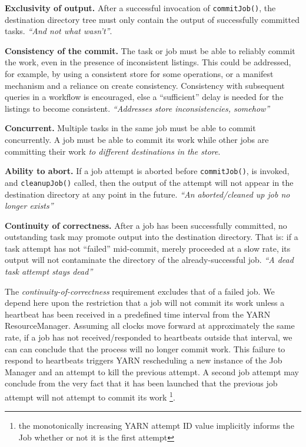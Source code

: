 \documentclass[conference]{IEEEtran}
\begin{document}
  \textbf{Exclusivity of output.}
  After a successful invocation of \texttt{commitJob()},
  the destination directory tree must only contain the output of successfully
  committed tasks.
  \emph{``And not what wasn't''}.

  \textbf{Consistency of the commit.}
  The task or job must be able to reliably commit the work, even in the presence
  of inconsistent listings.
  This could be addressed, for example, by using a consistent store for some operations,
  or a manifest mechanism and a reliance on create consistency.
  Consistency with subsequent queries in a workflow is encouraged, else a ``sufficient''
  delay is needed for the listings to become consistent.
  \emph{``Addresses store inconsistencies, somehow''}

  \textbf{Concurrent.}
  Multiple tasks in the same job must be able to commit concurrently.
  A job must be able to commit its work while other jobs are committing
  their work \emph{to different destinations in the store}.

  \textbf{Ability to abort.}
  If a job attempt is aborted before \texttt{commitJob()}, is invoked, and
  \texttt{cleanupJob()} called, then the output of the attempt will not appear in the
  destination directory at any point in the future.
  \emph{``An aborted/cleaned up job no longer exists''}


  \textbf{Continuity of correctness.}
  After a job has been successfully committed, no outstanding task may promote
  output into the destination directory.
  That is: if a task attempt has not ``failed'' mid-commit, merely proceeded at a slow rate,
  its output will not contaminate the directory of the already-successful job.
  \emph{``A dead task attempt stays dead''}


The \emph{continuity-of-correctness} requirement excludes that of a failed job.
We depend here upon the restriction that a job will not commit its work unless
a heartbeat has been received in a predefined time interval from the YARN ResourceManager.
Assuming all clocks move forward at approximately the same rate, if a job has
not received/responded to heartbeats outside that interval,
we can can conclude that the process will no longer commit work.
This failure to respond to heartbeats triggers YARN rescheduling a new
instance of the Job Manager and an attempt to kill the previous attempt.
A second job attempt may conclude from the very fact that it has been launched
that the previous job attempt will not attempt to commit its work
\footnote{the monotonically increasing YARN attempt ID value implicitly
informs the Job whether or not it is the first attempt}.
\end{document}
